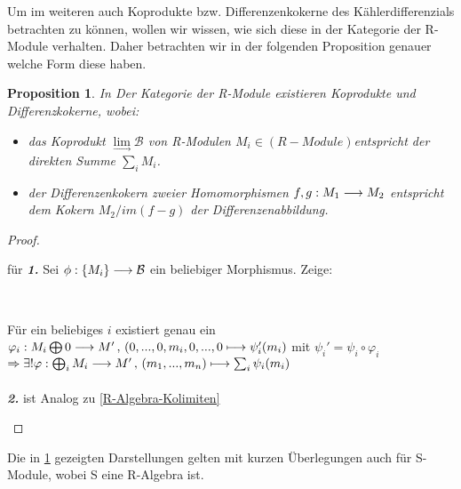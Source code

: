 \documentclass[10pt,a4paper]{report}
\newcounter{Aussage}[chapter]
\newtheorem{prop}[Aussage]{Proposition}
\newcommand{\functionfront}[3]{\nolinebreak{#1:#2 \longrightarrow #3}}
\newcommand{\function}[5]{\nolinebreak{#1:#2 \longrightarrow #3 \, , \, #4 \longmapsto #5}}
\newcommand{\colimes}[0]{\lim\limits_{ \longrightarrow }}
\newcommand{\immage}[1]{im(#1)}
\begin{document}
Um im weiteren auch Koprodukte bzw. Differenzenkokerne des Kählerdifferenzials betrachten zu können, wollen wir wissen, wie sich diese in der Kategorie der R-Module verhalten. Daher betrachten wir in der folgenden Proposition genauer welche Form diese haben.
\begin{prop}\label{R-Modul-Kolimiten}
In Der Kategorie der R-Module  existieren Koprodukte und Differenzkokerne, wobei:
\begin{itemize}
\item[\textbf{1.}] das Koprodukt $\colimes \mathcal{B}$ von R-Modulen $M_i \in (R-Module)$entspricht der direkten Summe $\sum_i M_i$.
\item[\textbf{2.}] der Differenzenkokern zweier Homomorphismen $\functionfront{f,g}{M_1}{M_2}$ entspricht dem Kokern $M_2/\immage{f-g}$ der Differenzenabbildung.
\end{itemize}
\end{prop}
\begin{proof}
\begin{itemize}

für \textit{\textbf{1.}} Sei $\functionfront{\phi}{\lbrace M_i \rbrace}{\mathcal{B}}$ ein beliebiger Morphismus. Zeige: \\
\begin{center}
\\
\end{center}
Für ein beliebiges $i$ existiert genau ein $\function{\varphi_i}{M_i \bigoplus 0}{M'}{(0,...,0,m_i,0,...,0}{\psi_i '(m_i)}$
 mit $\psi_i ' = \psi_i \circ \varphi_i$\\
$\Rightarrow  \exists ! \function{\varphi}{\bigoplus_i M_i}{M'}{(m_1,...,m_n)}{\sum_i \psi_i(m_i)}$\\
\ \\
\textit{\textbf{2.}} ist Analog zu \cref{R-Algebra-Kolimiten}
\end{itemize}
\end{proof}
Die in \cref{R-Modul-Kolimiten} gezeigten Darstellungen gelten mit kurzen Überlegungen auch für S-Module, wobei S eine R-Algebra ist.
\end{document}
